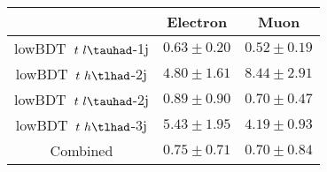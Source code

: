 \centering
\begin{tabular}{|c|c|c|} \hline
 & Electron & Muon\\\hline
lowBDT~$t~{l}\tauhad$-1j & $0.63\pm0.20$ & $0.52\pm0.19$\\\hline
lowBDT~$t~{h}\tlhad$-2j & $4.80\pm1.61$ & $8.44\pm2.91$\\\hline
lowBDT~$t~{l}\tauhad$-2j & $0.89\pm0.90$ & $0.70\pm0.47$\\\hline
lowBDT~$t~{h}\tlhad$-3j & $5.43\pm1.95$ & $4.19\pm0.93$\\\hline
Combined & $0.75\pm0.71$ & $0.70\pm0.84$\\\hline
\end{tabular}
